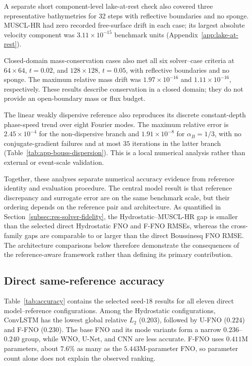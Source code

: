 A separate short component-level lake-at-rest check also covered three representative bathymetries for 32 steps with reflective boundaries and no sponge. MUSCL-HR had zero recorded free-surface drift in each case; its largest absolute velocity component was $3.11 \times 10^{-15}$ benchmark units (Appendix~\ref{app:lake-at-rest}).

Closed-domain mass-conservation cases also met all six solver--case criteria at $64 \times 64$, $t = 0.02$, and $128 \times 128$, $t = 0.05$, with reflective boundaries and no sponge. The maximum relative mass drift was $1.97 \times 10^{-16}$ and $1.11 \times 10^{-16}$, respectively. These results describe conservation in a closed domain; they do not provide an open-boundary mass or flux budget.

The linear weakly dispersive reference also reproduces its discrete constant-depth phase-speed trend over eight Fourier modes. The maximum relative error is $2.45 \times 10 ^ {-4}$ for the non-dispersive branch and $1.91 \times 10 ^ {-8}$ for $\alpha_B = 1 / 3$, with no conjugate-gradient failures and at most $35$ iterations in the latter branch (Table~\ref{tab:app-bouss-dispersion}). This is a local numerical analysis rather than external or event-scale validation.

Together, these analyses separate numerical accuracy evidence from reference identity and evaluation procedure. The central model result is that reference discrepancy and surrogate error are on the same benchmark scale, but their ordering depends on the reference pair and architecture. As quantified in Section~\ref{subsec:res-solver-fidelity}, the Hydrostatic--MUSCL-HR gap is smaller than the selected direct Hydrostatic FNO and F-FNO RMSEs, whereas the cross-family gaps are comparable to or larger than the direct Boussinesq FNO RMSE. The architecture comparisons below therefore demonstrate the consequences of the reference-aware framework rather than defining its primary contribution.

\FloatBarrier
\subsection{Direct same-reference accuracy}
\label{subsec:res-accuracy}

Table~\ref{tab:accuracy} contains the selected seed-$18$ results for all eleven direct model--reference configurations. Among the Hydrostatic configurations, ConvLSTM has the lowest global relative $L_2$ ($0.203$), followed by U-FNO ($0.224$) and F-FNO ($0.230$). The base FNO and its mode variants form a narrow $0.236$--$0.240$ group, while WNO, U-Net, and CNN are less accurate. F-FNO uses $0.411$M parameters, about $7.6\%$ as many as the $5.443$M-parameter FNO, so parameter count alone does not explain the observed ranking.

